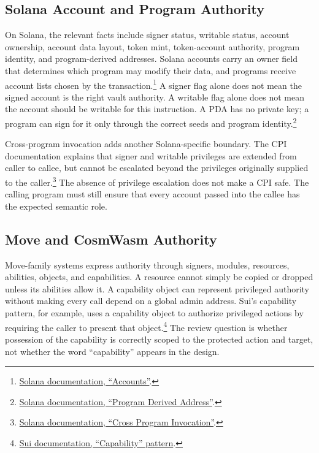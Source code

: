 \subsection{Solana Account and Program Authority}

On Solana, the relevant facts include signer status, writable status, account ownership, account data layout, token mint, token-account authority, program identity, and program-derived addresses. Solana accounts carry an owner field that determines which program may modify their data, and programs receive account lists chosen by the transaction.\footnote{\href{https://solana.com/docs/core/accounts}{Solana documentation, ``Accounts''}.} A signer flag alone does not mean the signed account is the right vault authority. A writable flag alone does not mean the account should be writable for this instruction. A PDA has no private key; a program can sign for it only through the correct seeds and program identity.\footnote{\href{https://solana.com/docs/core/pda}{Solana documentation, ``Program Derived Address''}.}

Cross-program invocation adds another Solana-specific boundary. The CPI documentation explains that signer and writable privileges are extended from caller to callee, but cannot be escalated beyond the privileges originally supplied to the caller.\footnote{\href{https://solana.com/docs/core/cpi}{Solana documentation, ``Cross Program Invocation''}.} The absence of privilege escalation does not make a CPI safe. The calling program must still ensure that every account passed into the callee has the expected semantic role.

\subsection{Move and CosmWasm Authority}

Move-family systems express authority through signers, modules, resources, abilities, objects, and capabilities. A resource cannot simply be copied or dropped unless its abilities allow it. A capability object can represent privileged authority without making every call depend on a global admin address. Sui's capability pattern, for example, uses a capability object to authorize privileged actions by requiring the caller to present that object.\footnote{\href{https://docs.sui.io/concepts/sui-move-concepts/patterns/capability}{Sui documentation, ``Capability'' pattern}.} The review question is whether possession of the capability is correctly scoped to the protected action and target, not whether the word ``capability'' appears in the design.

